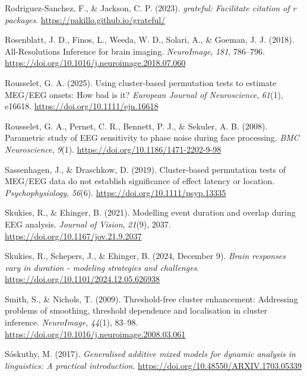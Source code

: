 \documentclass[
  doc,
  floatsintext,
  longtable,
  a4paper,
  nolmodern,
  notxfonts,
  notimes,
  colorlinks=true,linkcolor=blue,citecolor=blue,urlcolor=blue]{apa7}
\newlength{\cslhangindent}
\newenvironment{CSLReferences}[2] %
 {\begin{list}{}{%
  \setlength{\itemindent}{0pt}
  \setlength{\leftmargin}{0pt}
  \setlength{\parsep}{0pt}
  \ifodd #1
   \setlength{\leftmargin}{\cslhangindent}
   \setlength{\itemindent}{-1\cslhangindent}
  \fi
  \setlength{\itemsep}{#2\baselineskip}}}
 {\end{list}}
\begin{document}
\begin{CSLReferences}{1}{0}
Rodriguez-Sanchez, F., \& Jackson, C. P. (2023). \emph{{grateful}:
Facilitate citation of r packages}.
\url{https://pakillo.github.io/grateful/}

Rosenblatt, J. D., Finos, L., Weeda, W. D., Solari, A., \& Goeman, J. J.
(2018). All-Resolutions Inference for brain imaging. \emph{NeuroImage},
\emph{181}, 786--796.
\url{https://doi.org/10.1016/j.neuroimage.2018.07.060}

Rousselet, G. A. (2025). Using cluster-based permutation tests to
estimate {MEG}/{EEG} onsets: {How} bad is it? \emph{European Journal of
Neuroscience}, \emph{61}(1), e16618.
\url{https://doi.org/10.1111/ejn.16618}

Rousselet, G. A., Pernet, C. R., Bennett, P. J., \& Sekuler, A. B.
(2008). Parametric study of EEG sensitivity to phase noise during face
processing. \emph{BMC Neuroscience}, \emph{9}(1).
\url{https://doi.org/10.1186/1471-2202-9-98}

Sassenhagen, J., \& Draschkow, D. (2019). Cluster{-}based permutation
tests of MEG/EEG data do not establish significance of effect latency or
location. \emph{Psychophysiology}, \emph{56}(6).
\url{https://doi.org/10.1111/psyp.13335}

Skukies, R., \& Ehinger, B. (2021). Modelling event duration and overlap
during {EEG} analysis. \emph{Journal of Vision}, \emph{21}(9), 2037.
\url{https://doi.org/10.1167/jov.21.9.2037}

Skukies, R., Schepers, J., \& Ehinger, B. (2024, December 9).
\emph{Brain responses vary in duration - modeling strategies and
challenges}. \url{https://doi.org/10.1101/2024.12.05.626938}

Smith, S., \& Nichols, T. (2009). Threshold-free cluster enhancement:
Addressing problems of smoothing, threshold dependence and localisation
in cluster inference. \emph{NeuroImage}, \emph{44}(1), 83--98.
\url{https://doi.org/10.1016/j.neuroimage.2008.03.061}

Sóskuthy, M. (2017). \emph{Generalised additive mixed models for dynamic
analysis in linguistics: A practical introduction}.
\url{https://doi.org/10.48550/ARXIV.1703.05339}


\end{CSLReferences}
\end{document}
